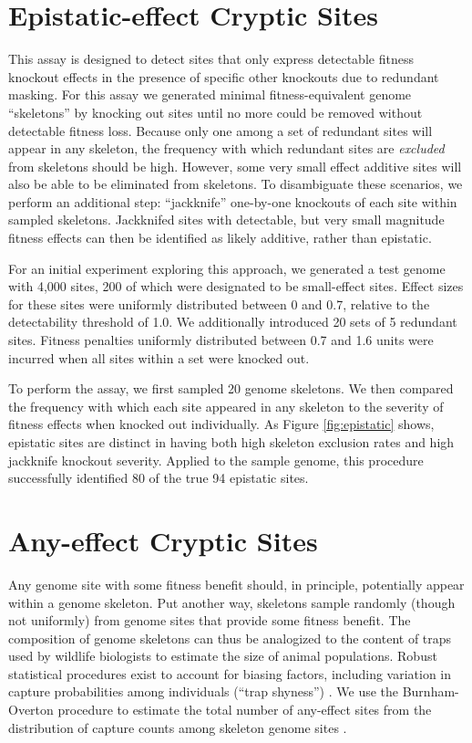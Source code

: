 \section{Epistatic-effect Cryptic Sites}



This assay is designed to detect sites that only express detectable fitness knockout effects in the presence of specific other knockouts due to redundant masking.
For this assay we generated minimal fitness-equivalent genome ``skeletons'' by knocking out sites until no more could be removed without detectable fitness loss.
Because only one among a set of redundant sites will appear in any skeleton, the frequency with which redundant sites are \textit{excluded} from skeletons should be high.
However, some very small effect additive sites will also be able to be eliminated from skeletons.
To disambiguate these scenarios, we perform an additional step: ``jackknife'' one-by-one knockouts of each site within sampled skeletons.
Jackknifed sites with detectable, but very small magnitude fitness effects can then be identified as likely additive, rather than epistatic.

For an initial experiment exploring this approach, we generated a test genome with 4,000 sites, 200 of which were designated to be small-effect sites.
Effect sizes for these sites were uniformly distributed between 0 and 0.7, relative to the detectability threshold of 1.0.
We additionally introduced 20 sets of 5 redundant sites.
Fitness penalties uniformly distributed between 0.7 and 1.6 units were incurred when all sites within a set were knocked out.

To perform the assay, we first sampled 20 genome skeletons.
We then compared the frequency with which each site appeared in any skeleton to the severity of fitness effects when knocked out individually.
As Figure \ref{fig:epistatic} shows, epistatic sites are distinct in having both high skeleton exclusion rates and high jackknife knockout severity.
Applied to the sample genome, this procedure successfully identified 80 of the true 94 epistatic sites.

\section{Any-effect Cryptic Sites}

Any genome site with some fitness benefit should, in principle, potentially appear within a genome skeleton.
Put another way, skeletons sample randomly (though not uniformly) from genome sites that provide some fitness benefit.
The composition of genome skeletons can thus be analogized to the content of traps used by wildlife biologists to estimate the size of animal populations.
Robust statistical procedures exist to account for biasing factors, including variation in capture probabilities among individuals (``trap shyness'') \citep{amstrup2010handbook}.
We use the Burnham-Overton procedure to estimate the total number of any-effect sites from the distribution of capture counts among skeleton genome sites \citep{burnham1979robust}.

